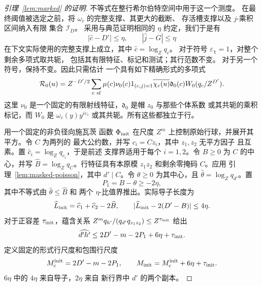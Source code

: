 \documentclass[11pt,a4paper]{article}
\numberwithin{equation}{section}
\numberwithin{figure}{section}
\theoremstyle{definition}
\theoremstyle{remark}
\begin{document}
\begin{proof}[引理~\ref{lem:marked} 的证明]
不等式在整行希尔伯特空间中用于这一个测度。
在最终阈值被选定之前，将 \(\omega_c\) 的完整支撑、其更大的截断、
存活槽支撑以及 \(j\)-乘积区间纳入有限
集合 \(\mathcal I_D\)。
采用与典范证明相同的 \(\eta\) 约定，我们于是有
\[
 |\widehat c-D'|\le\eta,\qquad |\widehat j-G|\le\eta
\]
在下文实际使用的完整支撑上成立，其中 \(\widehat c=\log_Zq_c\)。
对于符号
\(\varepsilon_\chi=1\)，对整个剩余多项式取共轭，
包括其有限特征、标记和测试；其行范数不变。
对于另一个符号，保持不变。因此只需估计
一个具有如下精确形式的多项式
\begin{equation}\label{eq:initial-residual-polynomial}
 \mathcal R_0(u)=Z^{-D'/2}\sum_{c\ {\rm sf}}
 \mu(c)\nu_0(c)1_{(c,j)=1}\overline{\chi_c(u)}
 \mathfrak d_0(c)W_0(q_c/Z^{D'}).
\end{equation}
这里 \(\nu_0\) 是一个固定的有限射线特征，\(\mathfrak d_0\)
是帽 \(z_0\) 与那些个体系数
或其共轭的乘积标记，而 \(W_0\) 是 \(\omega_c(y)y^{i\upsilon_c}\)
或其共轭。所有这些都独立于行。

用一个固定的非负径向施瓦茨
函数 \(\Phi_{\rm init}\) 在尺度 \(Z^m\) 上控制原始行球，并展开其平方。令 \(C\) 为两列的
最大公约数，并写 \(c_i=Cz_i\)，其中 \(z_1,z_2\) 无平方因子
且互素。置 \(\widehat c_i=\log_Zq_{c_i}\)，于是前述
支撑界适用于每个 \(i=1,2\)。令 \(B\ge0\) 为 \(C\) 的中心，并写
\(\widehat B=\log_Zq_C\)。行特征具有本原模
\(z_1z_2\) 和剩余零掩码 \(C\)。应用
引理~\ref{lem:masked-poisson}，其中 \(d'\mid C\)。令 \(\theta\ge0\)
为其中心，且 \(\widehat\theta=\log_Zq_{d'}\)。置
\[
 P_1=B-\theta\ge-2\eta,
\]
其中不等式由 \(\widehat\theta\le\widehat B\) 和
两个 \(\eta\)-比值界推出。实际导子长度为
\[
 \widehat L_{\rm init}=\widehat c_1+\widehat c_2-2\widehat B,
 \qquad |\widehat L_{\rm init}-2(D'-B)|\le4\eta.
\]
对于正容差 \(\tau_{\rm init}\)，蕴含关系
\(Z^mq_{h'}/(q_{d'}q_{z_1z_2})\le Z^{\tau_{\rm init}}\) 给出
\[
 \widehat{d'h'}\le2D'-m-2P_1+6\eta+\tau_{\rm init}.
\]
定义固定的形式行尺度和包围行尺度
\begin{equation}\label{eq:inverse-initial-row}
 M_c^{\rm init}=2D'-m-2P_1,\qquad
 M_{\rm init}=M_c^{\rm init}+6\eta+\tau_{\rm init}.
\end{equation}
\(6\eta\) 中的 \(4\eta\) 来自导子，\(2\eta\) 来自
新行界中 \(d'\) 的两个副本。


\end{proof}
\end{document}
